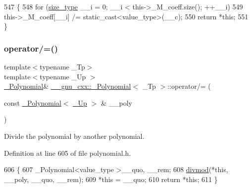 \begin{DoxyCode}
547         \{
548           \textcolor{keywordflow}{for} (\hyperlink{class____gnu__cxx_1_1__Polynomial_a8b25fcfd4acaad0c5c08b649c22da28a}{size\_type} \_\_i = 0; \_\_i < this->\_M\_coeff.size(); ++\_\_i)
549             this->\_M\_coeff[\_\_i] /= static\_cast<value\_type>(\_\_c);
550           \textcolor{keywordflow}{return} *\textcolor{keyword}{this};
551         \}
\end{DoxyCode}
\mbox{\label{class____gnu__cxx_1_1__Polynomial_a3374e3ab44ed1478de27f688aae6c3f1}} 
\subsubsection{\texorpdfstring{operator/=()}{operator/=()}\hspace{0.1cm}{\footnotesize\ttfamily [2/2]}}
{\footnotesize\ttfamily template$<$typename \+\_\+\+Tp$>$ \\
template$<$typename \+\_\+\+Up $>$ \\
\hyperlink{class____gnu__cxx_1_1__Polynomial}{\+\_\+\+Polynomial}\& \hyperlink{class____gnu__cxx_1_1__Polynomial}{\+\_\+\+\_\+gnu\+\_\+cxx\+::\+\_\+\+Polynomial}$<$ \+\_\+\+Tp $>$\+::operator/= (\begin{DoxyParamCaption}\item[{const \hyperlink{class____gnu__cxx_1_1__Polynomial}{\+\_\+\+Polynomial}$<$ \hyperlink{class____gnu__cxx_1_1__Polynomial_a242114d4b86648a5dff67a8221f80d40}{\+\_\+\+Up} $>$ \&}]{\+\_\+\+\_\+poly }\end{DoxyParamCaption})\hspace{0.3cm}{\ttfamily [inline]}}

Divide the polynomial by another polynomial. 

Definition at line 605 of file polynomial.\+h.


\begin{DoxyCode}
606         \{
607           \_Polynomial<value\_type >\_\_quo, \_\_rem;
608           \hyperlink{namespace____gnu__cxx_a84c52dc7c40b8b2731425e93db52903d}{divmod}(*\textcolor{keyword}{this}, \_\_poly, \_\_quo, \_\_rem);
609           *\textcolor{keyword}{this} = \_\_quo;
610           \textcolor{keywordflow}{return} *\textcolor{keyword}{this};
611         \}
\end{DoxyCode}
\mbox{\label{class____gnu__cxx_1_1__Polynomial_a207a09b3f170adcfbf21c26821c864dd}} 
